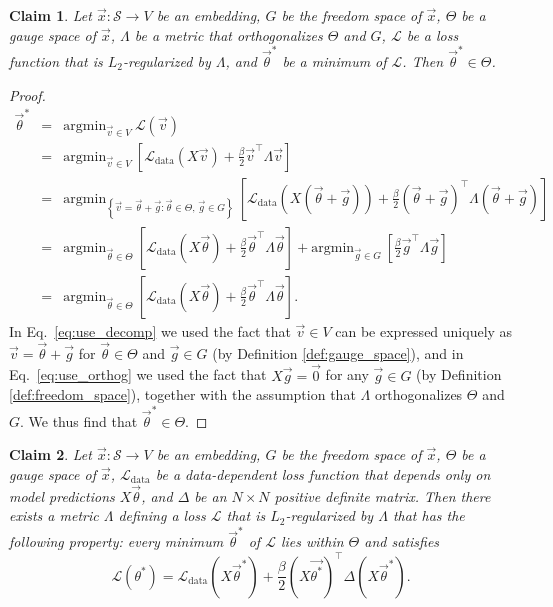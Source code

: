 \documentclass{article}
\numberwithin{myclaim}{section}
\newcommand{\eq}[1]{Eq.\ \ref{#1}}
\newcommand{\set}[1]{\left\{ #1 \right\}}
\newtheorem{claim}{Claim}
\begin{document}
\begin{claim} \label{claim:L_2}
    Let $\vec{x}:\mathcal{S} \to V$ be an embedding, $G$ be the freedom space of $\vec{x}$, $\Theta$ be a gauge space of $\vec{x}$, $\Lambda$ be a metric that orthogonalizes $\Theta$ and $G$, $\mathcal{L}$ be a loss function that is $L_2$-regularized by $\Lambda$, and $\vec{\theta}^*$ be a minimum of $\mathcal{L}$. Then $\vec{\theta}^* \in \Theta$.
\end{claim}
\begin{proof}
\begin{eqnarray}
    \vec{\theta}^* &=& \mathrm{argmin}_{\vec{v} \in V}~\mathcal{L}(\vec{v}) \\
    &=& \mathrm{argmin}_{\vec{v} \in V} ~\left[ \mathcal{L}_\mathrm{data}(X \vec{v}) + \frac{\beta}{2} \vec{v}^\top \Lambda \vec{v} \right] \\
    &=& \mathrm{argmin}_{\set{\vec{v} = \vec{\theta} + \vec{g}:\vec{\theta} \in \Theta,\,\vec{g} \in G}}~\left[ \mathcal{L}_\mathrm{data}(X (\vec{\theta} + \vec{g})) + \frac{\beta}{2} (\vec{\theta} + \vec{g})^\top \Lambda (\vec{\theta} + \vec{g}) \right] \label{eq:use_decomp} \\
    &=& \mathrm{argmin}_{\vec{\theta} \in \Theta}~\left[ \mathcal{L}_\mathrm{data}(X \vec{\theta}) + \frac{\beta}{2} \vec{\theta}^\top \Lambda \vec{\theta} \right] + \mathrm{argmin}_{\vec{g} \in G}~\left[ \frac{\beta}{2} \vec{g}^\top \Lambda \vec{g} \right] \label{eq:use_orthog} \\
    &=& \mathrm{argmin}_{\vec{\theta} \in \Theta}~\left[ \mathcal{L}_\mathrm{data}(X \vec{\theta}) + \frac{\beta}{2} \vec{\theta}^\top \Lambda \vec{\theta} \right].
\end{eqnarray}
In \eq{eq:use_decomp} we used the fact that $\vec{v} \in V$ can be expressed uniquely as $\vec{v} = \vec{\theta} + \vec{g}$ for $\vec{\theta} \in \Theta$ and $\vec{g} \in G$ (by Definition \ref{def:gauge_space}), and in \eq{eq:use_orthog} we used the fact that $X \vec{g} = \vec{0}$ for any $\vec{g} \in G$ (by Definition \ref{def:freedom_space}), together with the assumption that $\Lambda$ orthogonalizes $\Theta$ and $G$. We thus find that $ \vec{\theta}^* \in \Theta$.
\end{proof}
\begin{claim} \label{claim:Delta}
    Let $\vec{x}:\mathcal{S} \to V$ be an embedding, $G$ be the freedom space of $\vec{x}$, $\Theta$ be a gauge space of $\vec{x}$, $\mathcal{L}_\mathrm{data}$ be a data-dependent loss function that depends only on model predictions $X \vec{\theta}$, and $\Delta$ be an $N \times N$ positive definite matrix. Then there exists a metric $\Lambda$ defining a loss $\mathcal{L}$ that is $L_2$-regularized by $\Lambda$ that has the following property: every minimum $\vec{\theta}^* $ of $\mathcal{L}$ lies within $\Theta$ and satisfies
    \begin{equation} \label{eq:SL_2}
    \mathcal{L}(\theta^*)=\mathcal{L}_\mathrm{data}(X\vec{\theta}^*) + \frac{\beta}{2} \left(X \vec{\theta^* }\right) ^\top \Delta \left(X \vec{\theta}^*\right).
    \end{equation}
\end{claim}
\end{document}
